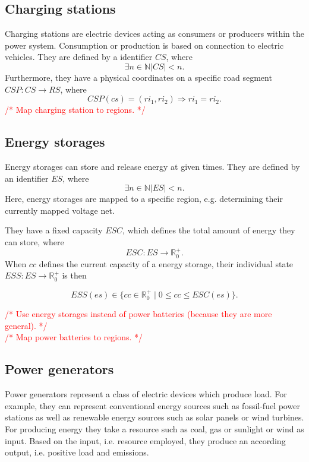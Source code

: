 \documentclass[conference]{IEEEtran}
\newcommand{\todo}[1]{\textcolor{red}{/* #1 */}}
\begin{document}
	\subsection{Charging stations}
	\label{charging_stations}
	Charging stations are electric devices acting as consumers or producers within the power system. Consumption or production is based on connection to electric vehicles.
	They are defined by a identifier $CS$, where
	\[
	\exists n \in \mathbb{N} |CS| < n \mathrm{.}
	\]
	Furthermore, they have a physical coordinates on a specific road segment
	$CSP : CS \rightarrow RS$, where
	\[
	CSP(cs) = (ri_1, ri_2) \Rightarrow ri_1 = ri_2 \mathrm{.}
	\]
	\todo{Map charging station to regions.}
	
	\subsection{Energy storages}
	\label{energy_storages}
	Energy storages can store and release energy at given times.
	They are defined by an identifier $ES$, where 
	\[
	\exists n \in \mathbb{N} |ES| < n \mathrm{.}
	\]
	Here, energy storages are mapped to a specific region, e.g. determining their currently mapped voltage net.
	
	They have a fixed capacity $ESC$, which defines the total amount of energy they can store, where
	\[	
	ESC : ES \rightarrow \mathbb{R}_0^+ \mathrm{.}
	\]
	When $cc$ defines the current capacity of a energy storage, their individual state $ESS : ES \rightarrow \mathbb{R}_0^+$ is then
	
	\[
	ESS(es) \in \{cc \in \mathbb{R}_0^+ \mid 0 \leq cc \leq ESC(es)\} \mathrm{.}
	\]
	
	\todo{Use energy storages instead of power batteries (because they are more general).}
	\\
	\todo{Map power batteries to regions.}
	
	\subsection{Power generators}
	\label{power_generators}
	
	Power generators represent a class of electric devices which produce load. For example, they can represent conventional energy sources such as fossil-fuel power stations as well as renewable energy sources such as solar panels or wind turbines. For producing energy they take a resource such as coal, gas or sunlight or wind as input. Based on the input, i.e. resource employed, they produce an according output, i.e. positive load and emissions. 
	
\end{document}
